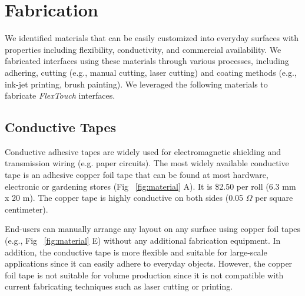 

\section{Fabrication}
We identified materials that can be easily customized into everyday surfaces with properties including flexibility, conductivity, and commercial availability. We fabricated interfaces using these materials through various processes, including adhering, cutting (e.g., manual cutting, laser cutting) and coating methods (e.g., ink-jet printing, brush painting). We leveraged the following materials to fabricate \textit{FlexTouch} interfaces.

\subsection{Conductive Tapes}
Conductive adhesive tapes are widely used for electromagnetic shielding and transmission wiring (e.g. paper circuits). The most widely available conductive tape is an adhesive copper foil tape that can be found at most hardware, electronic or gardening stores (Fig ~\ref{fig:material} A). It is \$2.50 per roll (6.3 mm x 20 m). The copper tape is highly conductive on both sides (0.05 $\Omega$ per square centimeter). 

End-users can manually arrange any layout on any surface using copper foil tapes (e.g., Fig ~\ref{fig:material} E) without any additional fabrication equipment. In addition, the conductive tape is more flexible and suitable for large-scale applications since it can easily adhere to everyday objects. However, the copper foil tape is not suitable for volume production since it is not compatible with current fabricating techniques such as laser cutting or printing. 


